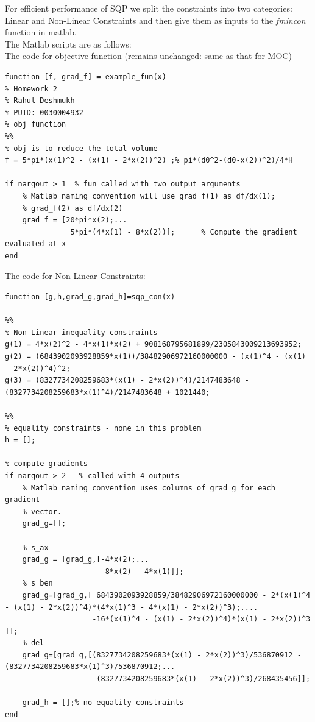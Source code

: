 \documentclass[12pt]{article}
\begin{document}
\begin{enumerate}[I]
\begin{enumerate}[1)]
For efficient performance of SQP we split the constraints into two categories: Linear and Non-Linear Constraints and then give them as inputs to the \textit{fmincon} function in matlab.\\

The Matlab scripts are as follows:\\
The code for objective function (remains unchanged: same as that for MOC)
\begin{lstlisting}
function [f, grad_f] = example_fun(x)
% Homework 2 
% Rahul Deshmukh
% PUID: 0030004932
% obj function 
%%
% obj is to reduce the total volume
f = 5*pi*(x(1)^2 - (x(1) - 2*x(2))^2) ;% pi*(d0^2-(d0-x(2))^2)/4*H    

if nargout > 1  % fun called with two output arguments
    % Matlab naming convention will use grad_f(1) as df/dx(1); 
    % grad_f(2) as df/dx(2)
    grad_f = [20*pi*x(2);... 
               5*pi*(4*x(1) - 8*x(2))];      % Compute the gradient evaluated at x
end
\end{lstlisting}
The code for Non-Linear Constraints:
\begin{lstlisting}
function [g,h,grad_g,grad_h]=sqp_con(x)

%%
% Non-Linear inequality constraints
g(1) = 4*x(2)^2 - 4*x(1)*x(2) + 908168795681899/2305843009213693952;
g(2) = (6843902093928859*x(1))/38482906972160000000 - (x(1)^4 - (x(1) - 2*x(2))^4)^2;
g(3) = (8327734208259683*(x(1) - 2*x(2))^4)/2147483648 - (8327734208259683*x(1)^4)/2147483648 + 1021440;

%%
% equality constraints - none in this problem
h = [];

% compute gradients
if nargout > 2   % called with 4 outputs
    % Matlab naming convention uses columns of grad_g for each gradient
    % vector. 
    grad_g=[];
    
    % s_ax
    grad_g = [grad_g,[-4*x(2);...
                       8*x(2) - 4*x(1)]]; 
    % s_ben
    grad_g=[grad_g,[ 6843902093928859/38482906972160000000 - 2*(x(1)^4 - (x(1) - 2*x(2))^4)*(4*x(1)^3 - 4*(x(1) - 2*x(2))^3);....
                    -16*(x(1)^4 - (x(1) - 2*x(2))^4)*(x(1) - 2*x(2))^3 ]];       
    % del
    grad_g=[grad_g,[(8327734208259683*(x(1) - 2*x(2))^3)/536870912 - (8327734208259683*x(1)^3)/536870912;...
                    -(8327734208259683*(x(1) - 2*x(2))^3)/268435456]];            
    
    grad_h = [];% no equality constraints
end


\end{lstlisting}
\end{enumerate}
\end{enumerate}
\end{document}
